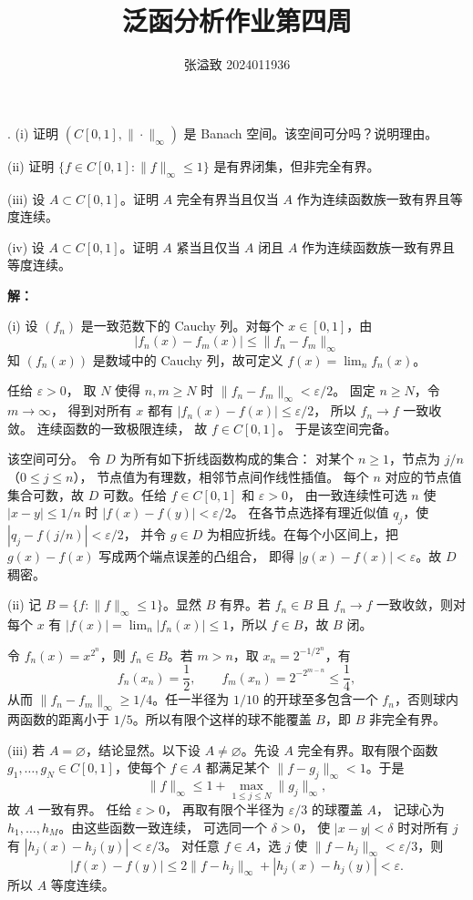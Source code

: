 \documentclass{article}
\title{泛函分析作业第四周}
\author{张溢致 2024011936}
\date{}
\begin{document}
\raggedbottom
\maketitle

\par\medskip{}. (i) 证明 $(C[0,1],\|\cdot\|_\infty)$ 是 Banach 空间。该空间可分吗？说明理由。

(ii) 证明 $\{f\in C[0,1]:\|f\|_\infty\le1\}$ 是有界闭集，但非完全有界。

(iii) 设 $A\subset C[0,1]$。证明 $A$ 完全有界当且仅当 $A$ 作为连续函数族一致有界且等度连续。

(iv) 设 $A\subset C[0,1]$。证明 $A$ 紧当且仅当 $A$ 闭且 $A$ 作为连续函数族一致有界且等度连续。


\par\nopagebreak[4]\noindent\textbf{解：}


(i) 设 $(f_n)$ 是一致范数下的 Cauchy 列。对每个 $x\in[0,1]$，由
\[
|f_n(x)-f_m(x)|\le\|f_n-f_m\|_\infty
\]
知 $(f_n(x))$ 是数域中的 Cauchy 列，故可定义 $f(x)=\lim_n f_n(x)$。

任给 $\varepsilon>0$，
取 $N$ 使得 $n,m\ge N$ 时 $\|f_n-f_m\|_\infty<\varepsilon/2$。
固定 $n\ge N$，令 $m\to\infty$，
得到对所有 $x$ 都有 $|f_n(x)-f(x)|\le\varepsilon/2$，
所以 $f_n\to f$ 一致收敛。
连续函数的一致极限连续，
故 $f\in C[0,1]$。
于是该空间完备。

该空间可分。
令 $D$ 为所有如下折线函数构成的集合：
对某个 $n\ge1$，节点为 $j/n$（$0\le j\le n$），
节点值为有理数，相邻节点间作线性插值。
每个 $n$ 对应的节点值集合可数，故 $D$ 可数。任给 $f\in C[0,1]$ 和 $\varepsilon>0$，
由一致连续性可选 $n$ 使 $|x-y|\le1/n$ 时 $|f(x)-f(y)|<\varepsilon/2$。
在各节点选择有理近似值 $q_j$，使 $|q_j-f(j/n)|<\varepsilon/2$，
并令 $g\in D$ 为相应折线。在每个小区间上，把 $g(x)-f(x)$ 写成两个端点误差的凸组合，
即得 $|g(x)-f(x)|<\varepsilon$。故 $D$ 稠密。

(ii) 记 $B=\{f:\|f\|_\infty\le1\}$。显然 $B$ 有界。若 $f_n\in B$ 且 $f_n\to f$ 一致收敛，则对每个 $x$ 有 $|f(x)|=\lim_n|f_n(x)|\le1$，所以 $f\in B$，故 $B$ 闭。

令 $f_n(x)=x^{2^n}$，则 $f_n\in B$。若 $m>n$，取 $x_n=2^{-1/2^n}$，有
\[
f_n(x_n)=\frac12,\qquad f_m(x_n)=2^{-2^{m-n}}\le\frac14,
\]
从而 $\|f_n-f_m\|_\infty\ge1/4$。任一半径为 $1/10$ 的开球至多包含一个 $f_n$，否则球内两函数的距离小于 $1/5$。所以有限个这样的球不能覆盖 $B$，即 $B$ 非完全有界。

(iii) 若 $A=\varnothing$，结论显然。以下设 $A\ne\varnothing$。先设 $A$ 完全有界。取有限个函数 $g_1,\ldots,g_N\in C[0,1]$，使每个 $f\in A$ 都满足某个 $\|f-g_j\|_\infty<1$。于是
\[
\|f\|_\infty\le1+\max_{1\le j\le N}\|g_j\|_\infty,
\]
故 $A$ 一致有界。
任给 $\varepsilon>0$，
再取有限个半径为 $\varepsilon/3$ 的球覆盖 $A$，
记球心为 $h_1,\ldots,h_M$。由这些函数一致连续，
可选同一个 $\delta>0$，
使 $|x-y|<\delta$ 时对所有 $j$ 有 $|h_j(x)-h_j(y)|<\varepsilon/3$。
对任意 $f\in A$，选 $j$ 使 $\|f-h_j\|_\infty<\varepsilon/3$，则
\[
|f(x)-f(y)|\le2\|f-h_j\|_\infty+|h_j(x)-h_j(y)|<\varepsilon.
\]
所以 $A$ 等度连续。
\end{document}
